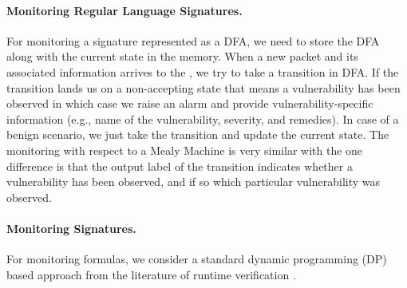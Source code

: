 \paragraph{Monitoring Regular Language Signatures.}
For monitoring a signature represented as a DFA, we need to store the DFA
along with the current state in the memory. When a new packet and its associated
information arrives to the \monitor, we try to take a transition in DFA. If the
transition lands us on a non-accepting state that means a vulnerability has been observed
in which case we raise an alarm and provide vulnerability-specific information (e.g.,
name of the vulnerability, severity, and remedies). In case of a benign scenario, we
just take the transition and update the current state. The monitoring with respect
to a Mealy Machine is very similar with the one difference is that the output
label of the transition indicates whether a vulnerability has been observed, and if so
which particular vulnerability was observed.


\paragraph{Monitoring \pltl Signatures.}
For monitoring \pltl formulas, we consider a standard dynamic programming (DP) based approach
from the literature of runtime verification \cite{d2005efficient, basin2010monitoring, basin2010policy,
 monpoly, bauer2011runtime, rosu2001synthesizing}.


